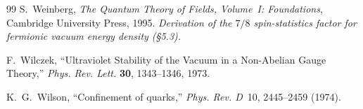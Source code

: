 \documentclass[12pt,oneside]{book}
\begin{document}
\begin{thebibliography}{99}
S.~Weinberg,
\emph{The Quantum Theory of Fields, Volume~I: Foundations},
Cambridge University Press, 1995.
\textit{Derivation of the $7/8$ spin-statistics factor for fermionic vacuum energy density (\S5.3).}


F.~Wilczek, ``Ultraviolet Stability of the Vacuum in a Non-Abelian Gauge Theory,'' \emph{Phys. Rev. Lett.} \textbf{30}, 1343--1346, 1973.

K.~G.~Wilson,
``Confinement of quarks,''
\emph{Phys. Rev. D}\ 10, 2445--2459 (1974).



\end{thebibliography}
\end{document}
